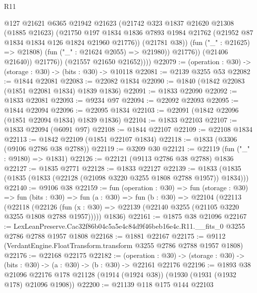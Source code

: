 \begin{lexlean}{R11}
\begin{coremodule}
                      @127
                      @21621
                      @6365
                      @21942
                      @21623
                      (@21742
                        @323
                        @1837
                        @21620
                        @21308
                        (@1885 @21623)
                        (@21750
                          @197
                          @1834
                          @1836
                          @7893
                          @1984
                          @21762
                          (@21952 @87 @1834 @1834 @126 @1824 @21960 @21776))
                        (@21781 @38))
                      (fun ("_" : @21625) => @21808)
                      (fun ("_" : @21624 @2055) => @21980))
                    @21776))
                (@21406 @21640))
              @21776))
          (@21557 @21650 @21652))))
@22079 := (operation : @30) -> (storage : @30) -> (bits : @30) -> @10118
@22081 := @2139 @3255 @53
@22082 := @1844 @22081
@22083 := @22082 @1834
@22090 := @1840 (@1842 @22083 (@1851 @22081 @1834) @1839 @1836)
@22091 := @1833 @22090
@22092 := @1833 @22081
@22093 := @9234 @97
@22094 := @22092 @22093
@22095 := @1844 @22094
@22096 := @22095 @1834
@22103 := @22091 (@1842 @22096 (@1851 @22094 @1834) @1839 @1836)
@22104 := @1833 @22103
@22107 := @1833 @22094 (@6091 @97)
@22108 := @1844 @22107
@22109 := @22108 @1834
@22113 := @1842 @22109 (@1851 @22107 @1834)
@22118 := @1833 (@3306 (@9106 @2786 @38 @2788))
@22119 := @3209 @30
@22121 := @22119 (fun ("_" : @9180) => @1831)
@22126 := @22121 (@9113 @2786 @38 @2788) @1836
@22127 := @1835 @2771
@22128 := @1833 @22127
@22139 := @1833 (@1835 (@1835 (@1833 (@22128 (@21098 @3220 @3255 @1808 @2788 @1957)) @1834)))
@22140 := @9106 @38
@22159 := fun (operation : @30) =>
  fun (storage : @30) =>
  fun (bits : @30) =>
  fun (a : @30) =>
  fun (b : @30) =>
  @22104
    (@22113
      (@22118
        (@22126 (fun (x : @30) => @22139 (@22140 @3255 (@21105 @3220 @3255 @1808 @2788 @1957)))))
      @1836)
@22161 := @1875 @38 @21096
@22167 := LexLeanPreserve.Cac32f86b04c5a5e4c84d9f46beb16e4c.R11.__fits_0
    @3255
    @2786
    @2788
    @1957
    @1808
@22168 := @1881 @22167
@22175 := @9112 (VerdantEngine.FloatTransform.transform @3255 @2786 @2788 @1957 @1808)
@22176 := @22168 @22175
@22182 := (operation : @30) ->
  (storage : @30) -> (bits : @30) -> (a : @30) -> (b : @30) -> @22161 @22176
@22196 := @1893
    @38
    @21096
    @22176
    @178
    @21128
    (@1914 (@1924 @38))
    (@1930 (@1931 (@1932 @178) @21096 @1908))
@22200 := @21139 @118 @175 @144 @22103

\end{coremodule}
\end{lexlean}
